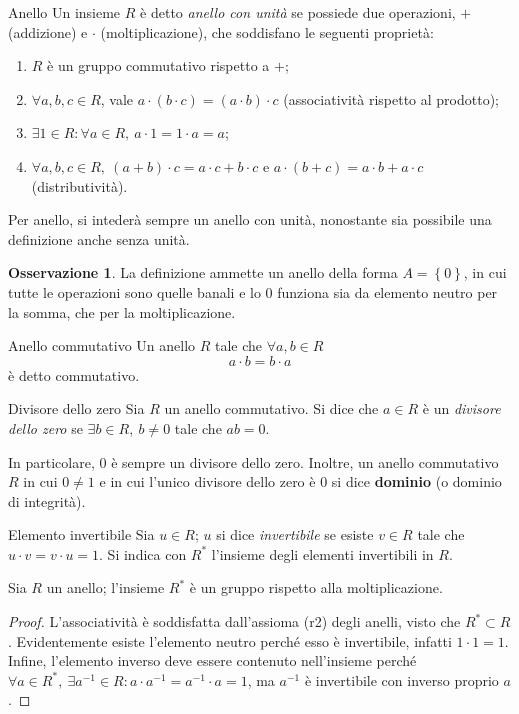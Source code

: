 \documentclass[11pt, a4paper]{scrartcl}
\theoremstyle{definition}
\numberwithin{esempio}{section}
\theoremstyle{definition}
\newtheorem{obs}{Osservazione}
\numberwithin{obs}{section}
\numberwithin{nota}{section}
\numberwithin{equation}{subsection}
\begin{document}
\begin{definizione}
	{Anello}{}
	Un insieme $R$ \`e detto \textit{anello con unit\`a} se possiede due operazioni, $+$ (addizione) e $\cdot $ (moltiplicazione), che soddisfano le seguenti propriet\`a:
	\begin{enumerate}[(r1).]
		\item $R$ \`e un gruppo commutativo rispetto a $+$;
		\item $\forall a,b,c \in R$, vale $a \cdot ( b\cdot c) = (a\cdot b) \cdot c$ (associativit\`a rispetto al prodotto);
		\item $\exists 1 \in R  : \forall a \in R, \ a \cdot 1 = 1 \cdot a = a $;
		\item $\forall a,b,c \in R, \ (a+b) \cdot c = a \cdot c + b \cdot  c$ e $a \cdot (b + c) = a \cdot b + a \cdot  c$ (distributivit\`a).
	\end{enumerate}
	Per anello, si inteder\`a sempre un anello con unit\`a, nonostante sia possibile una definizione anche senza unit\`a.	
\end{definizione}
\begin{obs}
	La definizione ammette un anello della forma $A = \left\{ 0 \right\} $, in cui tutte le operazioni sono quelle banali e lo $0$ funziona sia da elemento neutro per la somma, che per la moltiplicazione.
\end{obs}
\begin{definizione}
	{Anello commutativo}{}
	Un anello $R$ tale che $\forall a,b \in R$
	\[
	a \cdot b = b \cdot a 
	\] 
	\`e detto commutativo.
\end{definizione}
\begin{definizione}
	{Divisore dello zero}{}
	Sia $R$ un anello commutativo. 
	Si dice che $ a \in R$ \`e un \textit{divisore dello zero} se $\exists b \in R, \ b\neq 0$ tale che $ab = 0$.
\end{definizione}
\noindent In particolare, $0$ \`e sempre un divisore dello zero.
Inoltre, un anello commutativo $R$ in cui $0\neq 1$ e in cui l'unico divisore dello zero \`e $0$ si dice \textbf{dominio} (o dominio di integrit\`a).
\begin{definizione}
	{Elemento invertibile}{}
	Sia $u \in R$; $u$ si dice \textit{invertibile} se esiste $v \in R$ tale che $u\cdot  v = v \cdot u = 1$.
	Si indica con $R^*$ l'insieme degli elementi invertibili in $R$.
\end{definizione}
\begin{prop}
	{}{}	
	Sia $R$ un anello; l'insieme $R^*$ \`e un gruppo rispetto alla moltiplicazione.
	\begin{proof}
		L'associativit\`a \`e soddisfatta dall'assioma (r2) degli anelli, visto che $R^* \subset R$.
		Evidentemente esiste l'elemento neutro perch\'e esso \`e invertibile, infatti $1 \cdot 1 = 1$.
		Infine, l'elemento inverso deve essere contenuto nell'insieme perch\'e $\forall a \in R^*, \ \exists a^{-1}  \in R : a\cdot a^{-1} = a^{-1} \cdot a = 1$, ma $a^{-1} $ \`e invertibile con inverso proprio $a$.
	\end{proof}
\end{prop}
\end{document}
